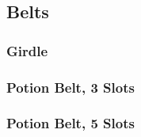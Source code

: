 \subsection{Belts}

\subsubsection{Girdle}

\subsubsection{Potion Belt, 3 Slots}

\subsubsection{Potion Belt, 5 Slots}